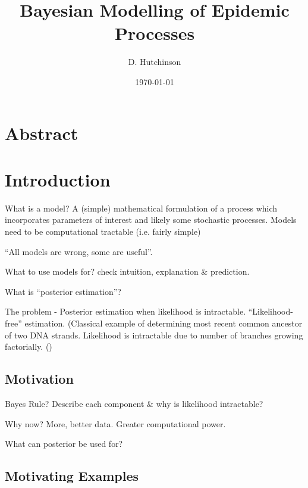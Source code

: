 \documentclass[11pt,a4paper,margin=0]{article}
\begin{document}
\title{Bayesian Modelling of Epidemic Processes}
\author{D. Hutchinson}
\date{\today}
\maketitle
\newpage

\section*{Abstract}\label{sec_abstract}
\newpage

\tableofcontents\newpage

\section{Introduction}\label{sec_introduction}

  \par What is a model? A (simple) mathematical formulation of a process which incorporates parameters of interest and likely some stochastic processes. Models need to be computational tractable (i.e. fairly simple)
  \par ``All models are wrong, some are useful''.
  \par What to use models for? check intuition, explanation \& prediction.
  \par What is ``posterior estimation''?
  \par The problem - Posterior estimation when likelihood is intractable. ``Likelihood-free'' estimation. (Classical example of determining most recent common ancestor of two DNA strands. Likelihood is intractable due to number of branches growing factorially. (\cite{selecting_summary_stats_in_ABC_for_calibration})

\subsection*{Motivation}\label{sec_motivation}

  \par Bayes Rule? Describe each component \& why is likelihood intractable?
  \par Why now? More, better data. Greater computational power.
  \par What can posterior be used for?

\subsection*{Motivating Examples}\label{sec_motivating_examples}
\end{document}
